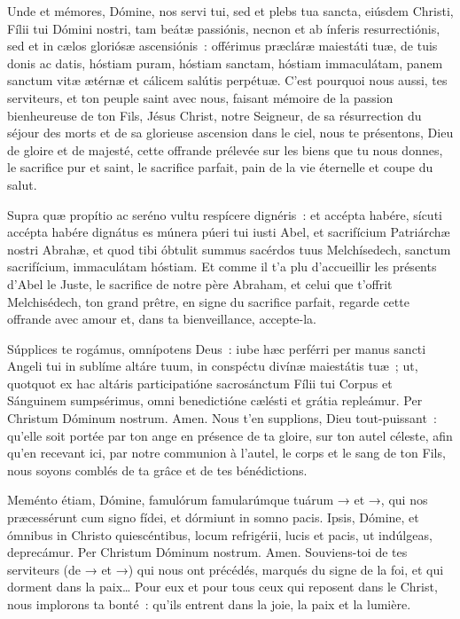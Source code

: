 
\begin{paracol}{2}

\LigneParacol{0cm}
{Unde et mémores, Dómine, nos servi tui, sed et plebs tua sancta, eiúsdem Christi, Fílii tui Dómini nostri, tam beátæ passiónis, necnon et ab ínferis resurrectiónis, sed et in cælos gloriósæ ascensiónis~: offérimus præcláræ maiestáti tuæ, de tuis donis ac datis, hóstiam puram, hóstiam sanctam, hóstiam immaculátam, panem sanctum vitæ ætérnæ et cálicem salútis perpétuæ.}
{C'est pourquoi nous aussi, tes serviteurs, et ton peuple saint avec nous, faisant mémoire de la passion bienheureuse de ton Fils, Jésus Christ, notre Seigneur, de sa résurrection du séjour des morts et de sa glorieuse ascension dans le ciel, nous te présentons, Dieu de gloire et de majesté, cette offrande prélevée sur les biens que tu nous donnes, le sacrifice pur et saint, le sacrifice parfait, pain de la vie éternelle et coupe du salut.}

\LigneParacol{0cm}
{Supra quæ propítio ac seréno vultu respícere dignéris~: et accépta habére, sícuti accépta habére dignátus es múnera púeri tui iusti Abel, et sacrifícium Patriárchæ nostri Abrahæ, et quod tibi óbtulit summus sacérdos tuus Melchísedech, sanctum sacrifícium, immaculátam hóstiam.}
{Et comme il t'a plu d'accueillir les présents d'Abel le Juste, le sacrifice de notre père Abraham, et celui que t'offrit Melchisédech, ton grand prêtre, en signe du sacrifice parfait, regarde cette offrande avec amour et, dans ta bienveillance, accepte-la.}

\LigneParacol{0cm}
{Súpplices te rogámus, omnípotens De\-us~: iube hæc perférri per manus sancti Angeli tui in sublíme altáre tuum, in conspéctu divínæ maiestátis tuæ~; ut, quotquot ex hac altáris participatióne sacrosánctum Fílii tui Corpus et Sánguinem sumpsérimus, omni benedictióne cælésti et grátia repleámur. Per Christum Dóminum nostrum. Amen.}
{Nous t'en supplions, Dieu tout-puis\-sant~: qu'elle soit portée par ton ange en présence de ta gloire, sur ton autel céleste, afin qu'en recevant ici, par notre communion à l'autel, le corps et le sang de ton Fils, nous soyons comblés de ta grâce et de tes bénédictions.}

\LigneParacol{0cm}
{Meménto étiam, Dómine, famulórum famularúmque tuárum → et →, qui nos præcessérunt cum signo fídei, et dórmiunt in somno pacis. Ipsis, Dómine, et ómnibus in Christo quiescéntibus, locum refrigérii, lucis et pacis, ut indúlgeas, deprecámur. Per Christum Dóminum nostrum. Amen.}
{Souviens-toi de tes serviteurs (de → et →) qui nous ont précédés, marqués du signe de la foi, et qui dorment dans la paix… Pour eux et pour tous ceux qui reposent dans le Christ, nous implorons ta bonté~: qu'ils entrent dans la joie, la paix et la lumière.}


\end{paracol}
